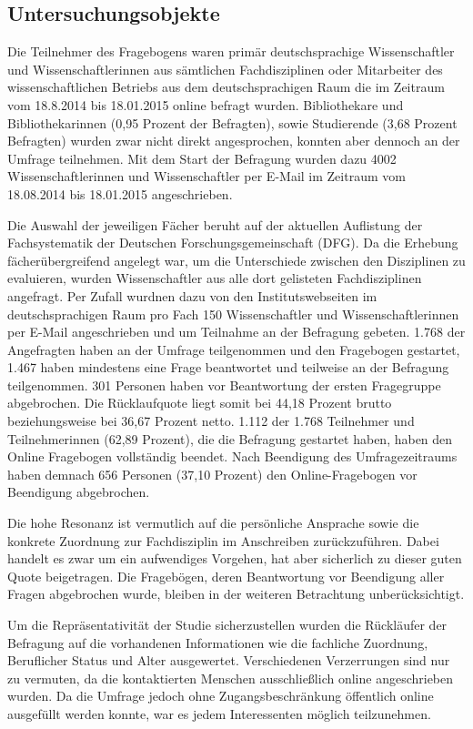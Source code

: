 \subsection{Untersuchungsobjekte}

Die Teilnehmer des Fragebogens waren primär deutschsprachige Wissenschaftler und Wissenschaftlerinnen aus sämtlichen Fachdisziplinen oder Mitarbeiter des wissenschaftlichen Betriebs aus dem deutschsprachigen Raum die im Zeitraum vom 18.8.2014 bis 18.01.2015 online befragt wurden. Bibliothekare und Bibliothekarinnen (0,95 Prozent der Befragten), sowie Studierende (3,68 Prozent Befragten) wurden zwar nicht direkt angesprochen, konnten aber dennoch an der Umfrage teilnehmen. Mit dem Start der Befragung wurden dazu 4002 Wissenschaftlerinnen und Wissenschaftler per E-Mail im Zeitraum vom 18.08.2014 bis 18.01.2015 angeschrieben.

Die Auswahl der jeweiligen Fächer beruht auf der aktuellen Auflistung der Fachsystematik der Deutschen Forschungsgemeinschaft (DFG). Da die Erhebung fächerübergreifend angelegt war, um die Unterschiede zwischen den Disziplinen zu evaluieren, wurden Wissenschaftler aus alle dort gelisteten Fachdisziplinen angefragt. Per Zufall wurdnen dazu von den Institutswebseiten im deutschsprachigen Raum pro Fach 150 Wissenschaftler und Wissenschaftlerinnen per E-Mail angeschrieben und um Teilnahme an der Befragung gebeten. 1.768 der Angefragten haben an der Umfrage teilgenommen und den Fragebogen gestartet, 1.467 haben mindestens eine Frage beantwortet und teilweise an der Befragung teilgenommen. 301 Personen haben vor Beantwortung der ersten Fragegruppe abgebrochen. Die Rücklaufquote liegt somit bei 44,18 Prozent brutto beziehungsweise bei 36,67 Prozent netto. 1.112 der 1.768 Teilnehmer und Teilnehmerinnen (62,89 Prozent), die die Befragung gestartet haben, haben den Online Fragebogen vollständig beendet. Nach Beendigung des Umfragezeitraums haben demnach 656 Personen (37,10 Prozent) den Online-Fragebogen vor Beendigung abgebrochen.

Die hohe Resonanz ist vermutlich auf die persönliche Ansprache sowie die konkrete Zuordnung zur Fachdisziplin im Anschreiben zurückzuführen. Dabei handelt es zwar um ein aufwendiges Vorgehen, hat aber sicherlich zu dieser guten Quote beigetragen. Die Fragebögen, deren Beantwortung vor Beendigung aller Fragen abgebrochen wurde, bleiben in der weiteren Betrachtung unberücksichtigt.

Um die Repräsentativität der Studie sicherzustellen wurden die Rückläufer der Befragung auf die vorhandenen Informationen wie die fachliche Zuordnung, Beruflicher Status und Alter ausgewertet. Verschiedenen Verzerrungen sind nur zu vermuten, da die kontaktierten Menschen ausschließlich online angeschrieben wurden. Da die Umfrage jedoch ohne Zugangsbeschränkung öffentlich online ausgefüllt werden konnte, war es jedem Interessenten möglich teilzunehmen.

